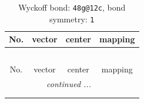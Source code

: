 \documentclass[fleqn,8pt]{jsarticle}
\begin{document}
\renewcommand{\arraystretch}{1.2}
\begin{longtable}{cccc}
\caption{Wyckoff bond: {\tt 48g@12c}, bond symmetry: {\tt 1}}
 \\
 \hline \hline
No. & vector & center & mapping \\ \hline \endfirsthead

\multicolumn{3}{l}{\tablename\ \thetable{}} \\
 \hline \hline
No. & vector & center & mapping \\ \hline \endhead

 \hline \hline
\multicolumn{3}{r}{\footnotesize\it continued ...} \\ \endfoot

 \hline \hline
\multicolumn{3}{r}{} \\ \endlastfoot


\end{longtable}
\end{document}
